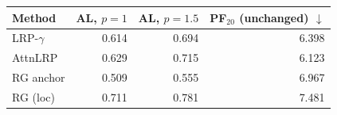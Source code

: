 \begin{tabular}{lrrr}
\toprule
Method & AL, $p=1$ & AL, $p=1.5$ & PF$_{20}$ (unchanged) $\downarrow$ \\
\midrule
LRP-$\gamma$ & 0.614 & 0.694 & 6.398 \\
AttnLRP & 0.629 & 0.715 & 6.123 \\
RG anchor & 0.509 & 0.555 & 6.967 \\
RG (loc) & 0.711 & 0.781 & 7.481 \\
\bottomrule
\end{tabular}
